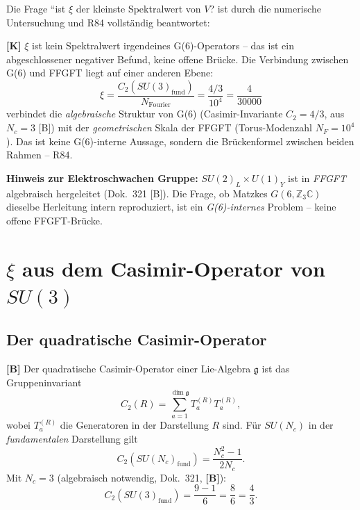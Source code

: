 Die Frage ``ist $\xi$ der kleinste Spektralwert von $V$?
ist durch die numerische Untersuchung und R84 vollständig beantwortet:

\textbf{[K]} $\xi$ ist kein Spektralwert irgendeines G(6)-Operators
-- das ist ein abgeschlossener negativer Befund, keine offene Brücke.
Die Verbindung zwischen G(6) und FFGFT liegt auf einer anderen Ebene:
\begin{equation}
  \xi = \frac{C_2(SU(3)_{\text{fund}})}{N_{\text{Fourier}}}
      = \frac{4/3}{10^4} = \frac{4}{30000}
\end{equation}
verbindet die \emph{algebraische} Struktur von G(6) (Casimir-Invariante
$C_2 = 4/3$, aus $N_c=3$ [B]) mit der \emph{geometrischen} Skala der
FFGFT (Torus-Modenzahl $N_F = 10^4$). Das ist keine G(6)-interne Aussage,
sondern die Brückenformel zwischen beiden Rahmen -- R84.

\textbf{Hinweis zur Elektroschwachen Gruppe:}
$SU(2)_L\times U(1)_Y$ ist in \emph{FFGFT} algebraisch hergeleitet
(Dok.~321 [B]). Die Frage, ob Matzkes $G(6,\mathbb{Z}_3\mathbb{C})$
dieselbe Herleitung intern reproduziert, ist ein \emph{G(6)-internes} Problem
-- keine offene FFGFT-Brücke.


\section{$\xi$ aus dem Casimir-Operator von $SU(3)$}

\subsection{Der quadratische Casimir-Operator}

\textbf{[B]} Der quadratische Casimir-Operator einer Lie-Algebra $\mathfrak{g}$
ist das Gruppeninvariant
\begin{equation}
  C_2(R) = \sum_{a=1}^{\dim\mathfrak{g}} T_a^{(R)} T_a^{(R)},
  \label{eq:casimir_def}
\end{equation}
wobei $T_a^{(R)}$ die Generatoren in der Darstellung $R$ sind.
Für $SU(N_c)$ in der \emph{fundamentalen} Darstellung gilt
\begin{equation}
  C_2(SU(N_c)_{\text{fund}}) = \frac{N_c^2 - 1}{2N_c}.
  \label{eq:casimir_SUN}
\end{equation}
Mit $N_c = 3$ (algebraisch notwendig, Dok.~321, \textbf{[B]}):
\begin{equation}
  C_2(SU(3)_{\text{fund}})
  = \frac{9 - 1}{6} = \frac{8}{6} = \frac{4}{3}.
  \label{eq:casimir_SU3}
\end{equation}

